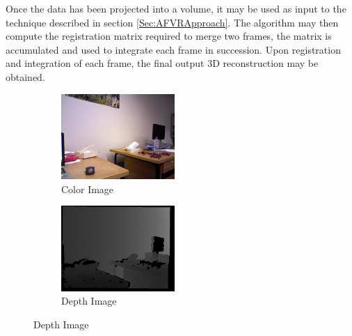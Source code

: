 Once the data has been projected into a volume, it may be used as input to the technique described in section \ref{Sec:AFVRApproach}. The algorithm may then compute the registration matrix required to merge two frames, the matrix is accumulated and used to integrate each frame in succession. Upon registration and integration of each frame, the final output 3D reconstruction may be obtained. \\

\begin{figure}[!htb] 
        \centering
        \begin{subfigure}[b]{1.8in}
                \includegraphics[width=1.7in]{images/ch2/colorF11}
                \caption{Color Image}
                \label{fig:COLEXAMPLE}
        \end{subfigure}%
        \begin{subfigure}[b]{1.8in}
                \includegraphics[width=1.7in]{images/ch2/depthF11}
                \caption{Depth Image}
                \label{fig:DEPTHEXAMPLE}
        \end{subfigure}
        

\end{figure}
